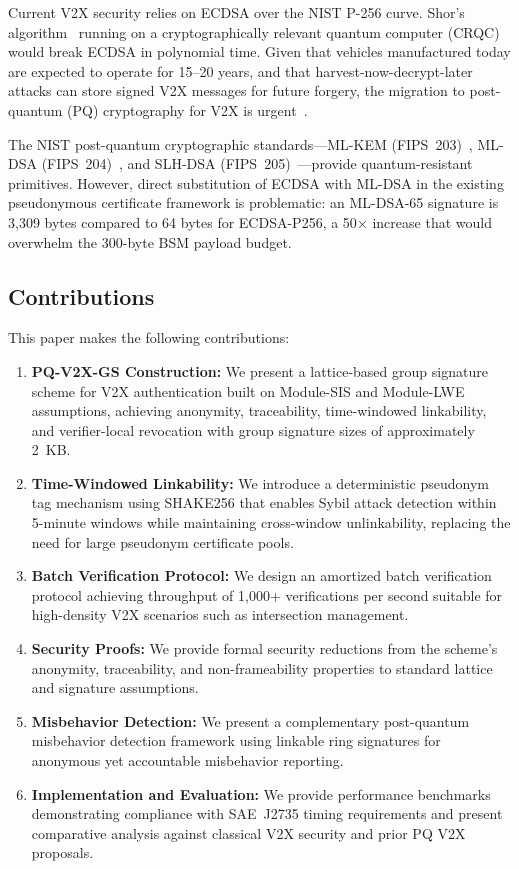 \documentclass[conference,10pt]{IEEEtran}
\newcommand{\shake}{\textsf{SHAKE256}}
\begin{document}
Current V2X security relies on ECDSA over the NIST P-256 curve. Shor's algorithm~\cite{shor1997} running on a cryptographically relevant quantum computer (CRQC) would break ECDSA in polynomial time. Given that vehicles manufactured today are expected to operate for 15--20 years, and that harvest-now-decrypt-later attacks can store signed V2X messages for future forgery, the migration to post-quantum (PQ) cryptography for V2X is urgent~\cite{mosca2018}.

The NIST post-quantum cryptographic standards---ML-KEM (FIPS~203)~\cite{fips203}, ML-DSA (FIPS~204)~\cite{fips204}, and SLH-DSA (FIPS~205)~\cite{fips205}---provide quantum-resistant primitives. However, direct substitution of ECDSA with ML-DSA in the existing pseudonymous certificate framework is problematic: an ML-DSA-65 signature is 3{,}309 bytes compared to 64 bytes for ECDSA-P256, a 50$\times$ increase that would overwhelm the 300-byte BSM payload budget.

\subsection{Contributions}

This paper makes the following contributions:

\begin{enumerate}
    \item \textbf{PQ-V2X-GS Construction:} We present a lattice-based group signature scheme for V2X authentication built on Module-SIS and Module-LWE assumptions, achieving anonymity, traceability, time-windowed linkability, and verifier-local revocation with group signature sizes of approximately 2~KB.

    \item \textbf{Time-Windowed Linkability:} We introduce a deterministic pseudonym tag mechanism using \shake{} that enables Sybil attack detection within 5-minute windows while maintaining cross-window unlinkability, replacing the need for large pseudonym certificate pools.

    \item \textbf{Batch Verification Protocol:} We design an amortized batch verification protocol achieving throughput of 1{,}000+ verifications per second suitable for high-density V2X scenarios such as intersection management.

    \item \textbf{Security Proofs:} We provide formal security reductions from the scheme's anonymity, traceability, and non-frameability properties to standard lattice and signature assumptions.

    \item \textbf{Misbehavior Detection:} We present a complementary post-quantum misbehavior detection framework using linkable ring signatures for anonymous yet accountable misbehavior reporting.

    \item \textbf{Implementation and Evaluation:} We provide performance benchmarks demonstrating compliance with SAE~J2735 timing requirements and present comparative analysis against classical V2X security and prior PQ V2X proposals.
\end{enumerate}
\end{document}

